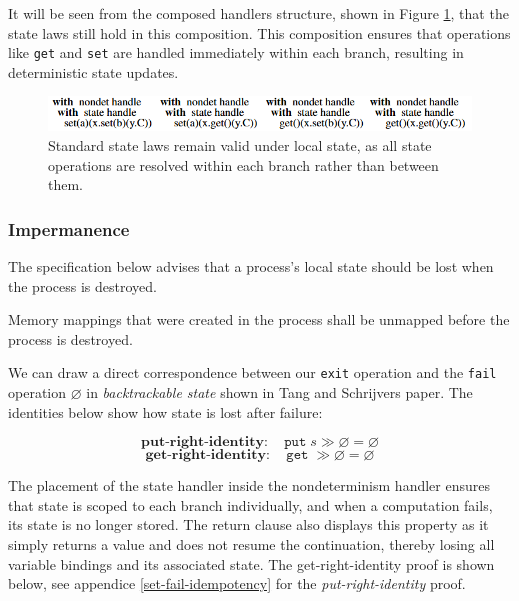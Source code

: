\documentclass[logo,bsc,singlespacing,parskip]{infthesis}
\begin{document}
It will be seen from the composed handlers structure, shown in Figure \ref{fig:local-state-laws}, that the state laws still hold in this composition. This composition ensures that operations like \lstinline{get} and \lstinline{set} are handled immediately within each branch, resulting in deterministic state updates.
\begin{figure}[H]

\centering
\vspace{1em}
\includegraphics[width=1\textwidth]{localStateHandlerComp.png}

\caption{Standard state laws remain valid under local state, as all state operations are resolved within each branch rather than between them.}
\label{fig:local-state-laws}
\end{figure}


\subsubsection{Impermanence} 
The specification below advises that a process's local state should be lost when the process is destroyed.

\begin{tcolorbox}[colback=gray!10, colframe=gray!60, sharp corners, boxrule=0.5pt, title={POSIX Base Specifications, Issue 7, p.554}]
Memory mappings that were created in the process shall be unmapped before the process
 is destroyed.
 \end{tcolorbox}
 
We can draw a direct correspondence between our \lstinline{exit} operation and the \lstinline{fail} operation $\varnothing$ in \textit{backtrackable state} shown in Tang and Schrijvers paper. The identities below show how state is lost after failure: 

\[
\textbf{put-right-identity}: \quad \texttt{put}\;s \gg \varnothing = \varnothing
\]
\vspace{-1em}
\[
\textbf{get-right-identity}: \quad \texttt{get}\; \gg \varnothing = \varnothing
\]

The placement of the state handler inside the nondeterminism handler ensures that state is scoped to each branch individually, and when a computation fails, its state is no longer stored. The return clause also displays this property as it simply returns a value and does not resume the continuation, thereby losing all variable bindings and its associated state. The get-right-identity proof is shown below, see appendice \ref{set-fail-idempotency} for the \textit{put-right-identity} proof.
\end{document}
